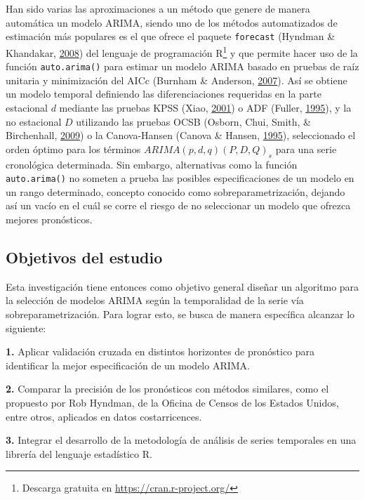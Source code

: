 \documentclass[
]{article}
\begin{document}
Han sido varias las aproximaciones a un método que genere de manera
automática un modelo ARIMA, siendo uno de los métodos automatizados de
estimación más populares es el que ofrece el paquete \texttt{forecast}
(Hyndman \& Khandakar, \protect\hyperlink{ref-auto.arima}{2008}) del
lenguaje de programación R\footnote{Descarga gratuita en
  \url{https://cran.r-project.org/}} y que permite hacer uso de la
función \texttt{auto.arima()} para estimar un modelo ARIMA basado en
pruebas de raíz unitaria y minimización del AICc (Burnham \& Anderson,
\protect\hyperlink{ref-burnham2007model}{2007}). Así se obtiene un
modelo temporal definiendo las diferenciaciones requeridas en la parte
estacional \(d\) mediante las pruebas KPSS (Xiao,
\protect\hyperlink{ref-doi:10.1111ux2f1467-9892.00213}{2001}) o ADF
(Fuller, \protect\hyperlink{ref-fuller1995introduction}{1995}), y la no
estacional \(D\) utilizando las pruebas OCSB (Osborn, Chui, Smith, \&
Birchenhall, \protect\hyperlink{ref-Osborn2009SEASONALITYAT}{2009}) o la
Canova-Hansen (Canova \& Hansen,
\protect\hyperlink{ref-10.2307ux2f1392184}{1995}), seleccionado el orden
óptimo para los términos \(ARIMA(p, d, q)(P, D, Q)_s\) para una serie
cronológica determinada. Sin embargo, alternativas como la función
\texttt{auto.arima()} no someten a prueba las posibles especificaciones
de un modelo en un rango determinado, concepto conocido como
sobreparametrización, dejando así un vacío en el cuál se corre el riesgo
de no seleccionar un modelo que ofrezca mejores pronósticos.

\subsection{Objetivos del estudio}

Esta investigación tiene entonces como objetivo general diseñar un
algoritmo para la selección de modelos ARIMA según la temporalidad de la
serie vía sobreparametrización. Para lograr esto, se busca de manera
específica alcanzar lo siguiente:

\textbf{1.} Aplicar validación cruzada en distintos horizontes de
pronóstico para identificar la mejor especificación de un modelo ARIMA.

\textbf{2.} Comparar la precisión de los pronósticos con métodos
similares, como el propuesto por Rob Hyndman, de la Oficina de Censos de
los Estados Unidos, entre otros, aplicados en datos costarricences.

\textbf{3.} Integrar el desarrollo de la metodología de análisis de
series temporales en una librería del lenguaje estadístico R.
\end{document}
